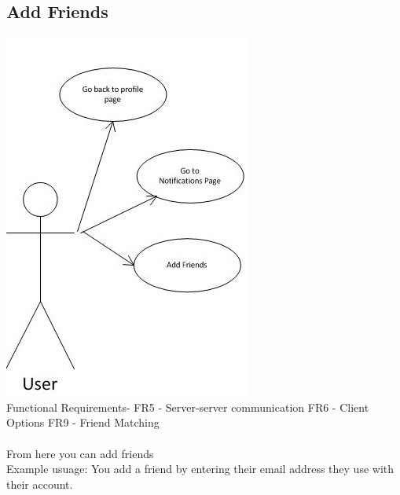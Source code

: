 \documentclass{project}
\begin{document}
\subsection{Add Friends}
\includegraphics[scale=0.6]{AddFriendsPageUseCase.jpg}
\\
Functional Requirements-
FR5 - Server-server communication
FR6 - Client Options
FR9 - Friend Matching
\\
\\
From here you can add friends
\\
Example usuage: You add a friend by entering their email address they use with
their account.

\newpage
\end{document}
